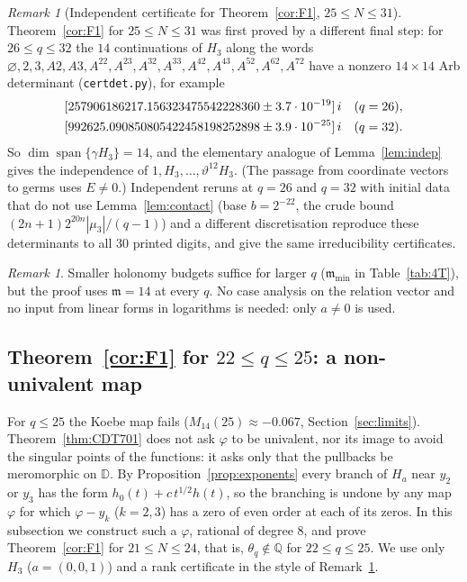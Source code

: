 \documentclass[11pt]{amsart}
\theoremstyle{definition}
\theoremstyle{remark}
\newtheorem{remark}[proposition]{Remark}
\numberwithin{equation}{section}
\newcommand{\QQ}{\mathbb{Q}}
\newcommand{\DD}{\mathbb{D}}
\newcommand{\fm}{\mathfrak{m}}
\newcommand{\file}[1]{{\def\_{\textunderscore\allowbreak}\texttt{#1}}}
\begin{document}
\begin{remark}[Independent certificate for Theorem~\ref{cor:F1}, $25\le N\le31$]\label{rem:F1cert}
Theorem~\ref{cor:F1} for $25\le N\le31$ was first proved by a different final step: for $26\le q\le32$ the $14$ continuations of $H_3$
along the words $\varnothing,2,3,A2,A3,A^22,A^23,A^32,A^33,A^42,A^43,A^52,A^62,A^72$ have a nonzero $14\times14$ Arb
determinant (\file{cert\_det.py}), for example
\[
\begin{gathered}
\relax[257906186217.156323475542228360\pm3.7\cdot10^{-19}]\,i\quad(q=26),\\
[992625.090850805422458198252898\pm3.9\cdot10^{-25}]\,i\quad(q=32).
\end{gathered}
\]
So
$\dim\operatorname{span}\{\gamma H_3\}=14$, and the elementary analogue of Lemma~\ref{lem:indep} gives the independence
of $1,H_3,\dots,\vartheta^{12}H_3$. (The passage from coordinate vectors to germs uses $E\ne0$.) Independent reruns at
$q=26$ and $q=32$ with initial data that do not use Lemma~\ref{lem:contact} (base $b=2^{-22}$, the crude bound
$(2n+1)2^{20n}|\mu_3|/(q-1)$) and a different discretisation reproduce these determinants to all $30$ printed digits,
and give the same irreducibility certificates.
\end{remark}

\begin{remark}
Smaller holonomy budgets suffice for larger $q$ ($\fm_{\min}$ in Table~\ref{tab:4T}), but the proof uses $\fm=14$ at
every $q$. No case analysis on the relation vector and no input from linear forms in logarithms is needed: only $a\ne0$
is used.
\end{remark}

\subsection{Theorem~\ref{cor:F1} for \texorpdfstring{$22\le q\le25$}{22 <= q <= 25}: a non-univalent map}\label{sec:nonuniv}
For $q\le25$ the Koebe map fails ($M_{14}(25)\approx-0.067$, Section~\ref{sec:limits}). Theorem~\ref{thm:CDT701} does not
ask $\varphi$ to be univalent, nor its image to avoid the singular points of the functions: it asks only that the pullbacks
be meromorphic on $\DD$. By Proposition~\ref{prop:exponents} every branch of $H_a$ near $y_2$ or $y_3$ has the form
$h_0(t)+c\,t^{1/2}h(t)$, so the branching is undone by any map $\varphi$ for which $\varphi-y_k$ ($k=2,3$) has a zero of even
order at each of its zeros. In this subsection we construct such a $\varphi$, rational of degree $8$, and prove
Theorem~\ref{cor:F1} for $21\le N\le24$, that is, $\theta_q\notin\QQ$ for $22\le q\le25$. We use only $H_3$
($a=(0,0,1)$) and a rank certificate in the style of Remark~\ref{rem:F1cert}.
\end{document}
